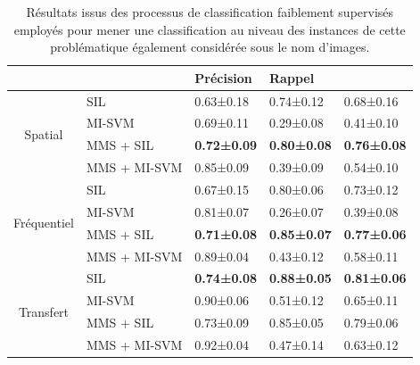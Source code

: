 \begin{table}[H]
    \centering
    \begin{tabular}{cllll}
        \toprule
        \multicolumn{1}{l}{}         &              & Précision          & Rappel             & \fscore{}            \\ \midrule
        \multirow{4}{*}{Spatial}     & SIL          & 0.63±0.18          & 0.74±0.12          & 0.68±0.16          \\
                                     & MI-SVM       & 0.69±0.11          & 0.29±0.08          & 0.41±0.10          \\
                                     & MMS + SIL    & \textbf{0.72±0.09} & \textbf{0.80±0.08} & \textbf{0.76±0.08} \\
                                     & MMS + MI-SVM & 0.85±0.09          & 0.39±0.09          & 0.54±0.10          \\ \midrule
        \multirow{4}{*}{Fréquentiel} & SIL          & 0.67±0.15          & 0.80±0.06          & 0.73±0.12          \\
                                     & MI-SVM       & 0.81±0.07          & 0.26±0.07          & 0.39±0.08          \\
                                     & MMS + SIL    & \textbf{0.71±0.08} & \textbf{0.85±0.07} & \textbf{0.77±0.06} \\
                                     & MMS + MI-SVM & 0.89±0.04          & 0.43±0.12          & 0.58±0.11          \\ \midrule
        \multirow{4}{*}{Transfert}   & SIL          & \textbf{0.74±0.08} & \textbf{0.88±0.05} & \textbf{0.81±0.06} \\
                                     & MI-SVM       & 0.90±0.06          & 0.51±0.12          & 0.65±0.11          \\
                                     & MMS + SIL    & 0.73±0.09          & 0.85±0.05          & 0.79±0.06          \\
                                     & MMS + MI-SVM & 0.92±0.04          & 0.47±0.14          & 0.63±0.12          \\ \bottomrule
    \end{tabular}
    \caption{Résultats issus des processus de classification faiblement supervisés employés pour mener une classification au niveau des instances de cette problématique également considérée sous le nom d'images.}
    \label{tab:results_lesion_classification_weakly_image}
\end{table}\par

